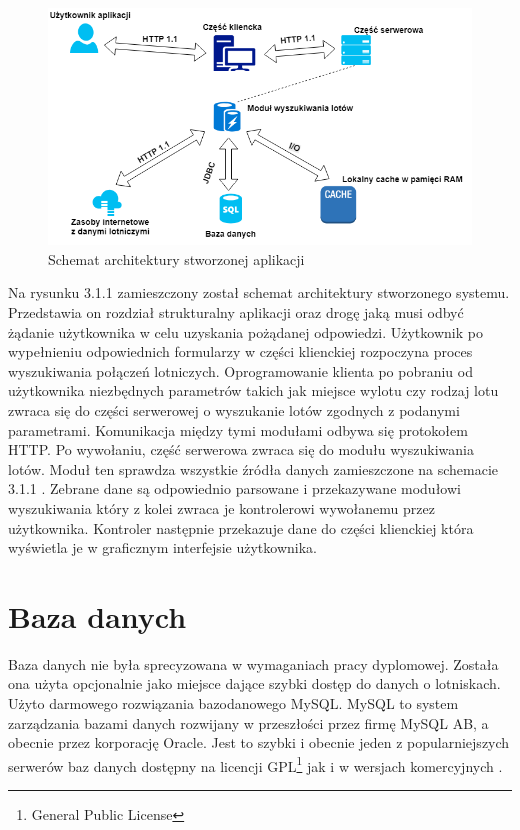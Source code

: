 \documentclass[12pt, twoside]{report}
\begin{document}
\begin{figure}[!ht]
\centering
\includegraphics[scale=0.60, keepaspectratio]{architecure_diagram.png}
\caption{Schemat architektury stworzonej aplikacji}
\label{fig:architecure_diagram}
\end{figure}

\newpage
Na rysunku 3.1.1 zamieszczony został schemat architektury stworzonego systemu. Przedstawia on rozdział strukturalny aplikacji oraz drogę jaką musi odbyć żądanie użytkownika w celu uzyskania pożądanej odpowiedzi. Użytkownik po wypełnieniu odpowiednich formularzy w części klienckiej rozpoczyna proces wyszukiwania połączeń lotniczych. Oprogramowanie klienta po pobraniu od użytkownika niezbędnych parametrów takich jak miejsce wylotu czy rodzaj lotu zwraca się do części serwerowej o wyszukanie lotów zgodnych z podanymi parametrami. Komunikacja między tymi modułami odbywa się protokołem HTTP. Po wywołaniu, część serwerowa zwraca się do modułu wyszukiwania lotów. Moduł ten sprawdza wszystkie źródła danych zamieszczone na schemacie 3.1.1 . Zebrane dane są odpowiednio parsowane i przekazywane modułowi wyszukiwania który z kolei zwraca je kontrolerowi wywołanemu przez użytkownika. Kontroler następnie przekazuje dane do części klienckiej która wyświetla je w  graficznym interfejsie użytkownika. 
\section{Baza danych}
Baza danych nie była sprecyzowana w wymaganiach pracy dyplomowej. Została ona użyta opcjonalnie jako miejsce dające szybki dostęp do danych o lotniskach. Użyto darmowego rozwiązania bazodanowego MySQL. MySQL to system zarządzania bazami danych rozwijany w przeszłości przez firmę MySQL AB, a obecnie przez korporację Oracle. Jest to szybki i obecnie jeden z popularniejszych serwerów baz danych dostępny na licencji GPL\footnote{General Public License} jak i w wersjach komercyjnych \cite{mysql}.
\end{document}

